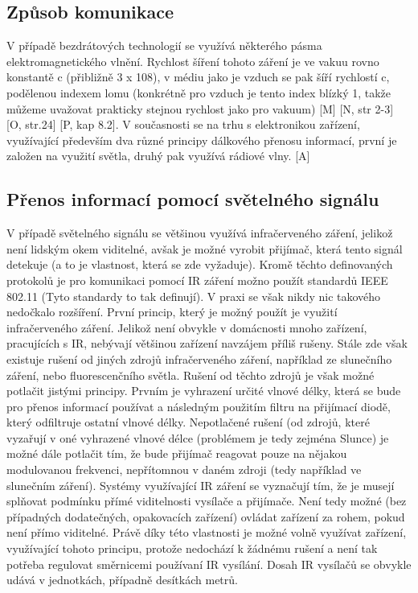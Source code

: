 \subsection*{Způsob komunikace}
V případě bezdrátových technologií se využívá některého pásma elektromagnetického vlnění. Rychlost šíření tohoto záření je ve vakuu rovno konstantě c (přibližně 3 x 108), v médiu jako je vzduch se pak šíří rychlostí c, podělenou indexem lomu (konkrétně pro vzduch je tento index blízký 1, takže můžeme uvažovat prakticky stejnou rychlost jako pro vakuum) [M] [N, str 2-3] [O, str.24] [P, kap 8.2].\newline
V současnosti se na trhu s elektronikou zařízení, využívající především dva různé principy dálkového přenosu informací, první je založen na využití světla, druhý pak využívá rádiové vlny. [A]

\subsection*{Přenos informací pomocí světelného signálu}
V případě světelného signálu se většinou využívá infračerveného záření, jelikož není lidským okem viditelné, avšak je možné vyrobit přijímač, která tento signál detekuje (a to je vlastnost, která se zde vyžaduje). \newline
Kromě těchto definovaných protokolů je pro komunikaci pomocí IR záření možno použít standardů IEEE 802.11 (Tyto standardy to tak definují). V praxi se však nikdy nic takového nedočkalo rozšíření. \newline
První princip, který je možný použít je využití infračerveného záření. Jelikož není obvykle v domácnosti mnoho zařízení, pracujících s IR, nebývají většinou zařízení navzájem příliš rušeny. Stále zde však existuje rušení od jiných zdrojů infračerveného záření, například ze slunečního záření, nebo fluorescenčního světla. Rušení od těchto zdrojů je však možné potlačit jistými principy. Prvním je vyhrazení určité vlnové délky, která se bude pro přenos informací používat a následným použitím filtru na přijímací diodě, který odfiltruje ostatní vlnové délky. Nepotlačené rušení (od zdrojů, které vyzařují v oné vyhrazené vlnové délce (problémem je tedy zejména Slunce) je možné dále potlačit tím, že bude přijímač reagovat pouze na nějakou modulovanou frekvenci, nepřítomnou v daném zdroji (tedy například ve slunečním záření). Systémy využívající IR záření se vyznačují tím, že je musejí splňovat podmínku přímé viditelnosti vysílače a přijímače. Není tedy možné (bez případných dodatečných, opakovacích zařízení) ovládat zařízení za rohem, pokud není přímo viditelné. Právě díky této vlastnosti je možné volně využívat zařízení, využívající tohoto principu, protože nedochází k žádnému rušení a není tak potřeba regulovat směrnicemi používaní IR vysílání. Dosah IR vysílačů se obvykle udává v jednotkách, případně desítkách metrů.

